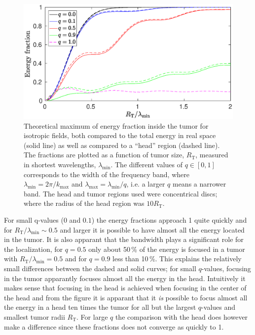 \documentclass[11pt,a4paper, 
swedish,english %
]{article}
\newcommand{\RT}{\ensuremath{R_{\text{T}}}}
\begin{document}
\begin{figure}
\begin{center}
\centerline{ %
\includegraphics[width=15cm]{ring_both_L1000.eps}
}
\caption{Theoretical maximum of energy fraction inside the tumor for
  isotropic fields, both compared to the total energy in real space
  (solid line) as well as compared to a ``head'' region (dashed
  line). The fractions are plotted as a function of tumor size, $\RT$,
  measured in shortest wavelengths, $\lambda_{\min}$. The different
  values of $q\in[0, 1]$ corresponds to the width of the frequency
  band, where $\lambda_{\min}=2\pi/k_{\max}$ and
  $\lambda_{\max}=\lambda_{\min}/q$, i.e. a larger $q$ means a
  narrower band. The head and tumor regions used were concentrical
  discs; where the radius of the head region was $10\RT$. } 
\label{fig:both}
\end{center}
\end{figure}

For small q-values ($0$ and $0.1$) the energy fractions approach 1
quite quickly and for $\RT/\lambda_{\min} \sim 0.5$ and larger it is
possible to have almost all the energy located in the tumor. It is
also apparant that the bandwidth plays a significant role for the
localization, for $q=0.5$ only about 50\,\% of the energy is focused
in a tumor with $\RT/\lambda_{\min}=0.5$ and for $q=0.9$ less than
10\,\%. 
This explains the relatively small differences between the dashed and
solid curves; for small $q$-values, focusing in the tumor apparantly
focuses almost all the energy in the head. Intuitively it makes sense
that focusing in the head is achieved when focusing in the center of
the head and from the figure it is apparant that it \emph{is} possible
to focus almost all the energy in a head ten times the tumor for all
but the largest $q$-values and smallest tumor radii $\RT$. For large
$q$ the comparison with the head does however make a difference since
these fractions does not converge as quickly to 1.  
\end{document}
